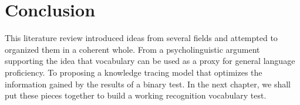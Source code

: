 \section{Conclusion}
This literature review introduced ideas from several fields and attempted to organized them in a coherent whole. From a psycholinguistic argument supporting the idea that vocabulary can be used as a proxy for general language proficiency. To proposing a knowledge tracing model that optimizes the information gained by the results of a binary test. In the next chapter, we shall put these pieces together to build a working recognition vocabulary test.